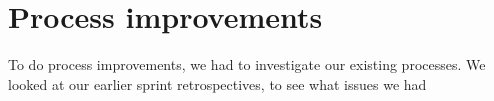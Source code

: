 \section{Process improvements} %
\label{sec:improvements}
To do process improvements, we had to investigate our existing processes. We looked at our earlier sprint retrospectives, to see what issues we had  
